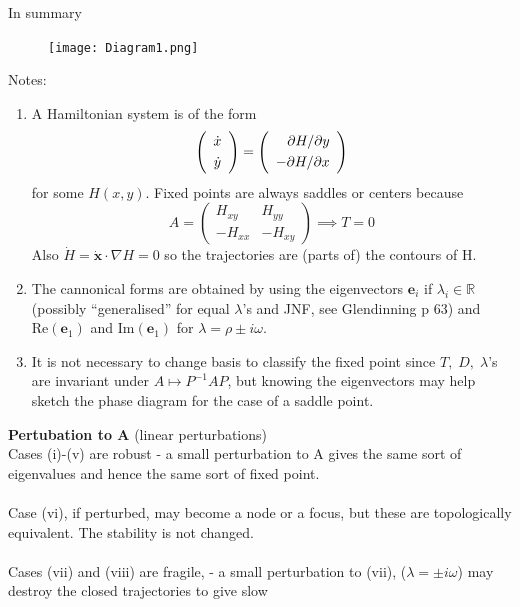 \documentclass{article}
\begin{document}
In summary 
\begin{figure}[H]
\centering
\texttt{[image: Diagram1.png]}
\end{figure}
%
Notes:
\begin{enumerate}[(1)]
\item A Hamiltonian system is of the form
\[ \left( \begin{array}{c} \dot{x} \vspace{1mm}\\ \dot{y} \end{array} \right) =
\left( \begin{array}{r} \partial H / \partial y \vspace{1mm}\\ - \partial H / \partial x \end{array} \right) \]
for some $H(x,y)$. Fixed points are always saddles or centers because
\[ A = \left( \begin{array}{rr} H_{xy} & H_{yy} \\ -H_{xx} & -H_{xy} \end{array} \right) \implies T = 0 \]
Also $\dot{H} = \dot{\bm{x}}\cdot \nabla H = 0$ so the trajectories are
 (parts of) the contours of H.

\item The cannonical forms are obtained by using the eigenvectors $\bm{e}_i$ if
$\lambda _ i \in \mathbb{R}$ (possibly ``generalised'' for equal $\lambda$'s
and JNF, see Glendinning p 63) and $\mathrm{Re}(\bm{e}_1)$ and $\mathrm{Im}(\bm{e}_1)$ for 
$\lambda = \rho \pm i \omega$.

\item It is not necessary to change basis to classify the fixed point since
$T, \; D, \; \lambda$'s are invariant under $A \mapsto P^{-1}AP$, but knowing 
the eigenvectors may help sketch the phase diagram for the case of a saddle 
point.
\end{enumerate}
%
\textbf{Pertubation to A} (linear perturbations) 
\\
Cases (i)-(v) are robust - a small perturbation to A gives the same sort of 
eigenvalues and hence the same sort of fixed point.
\\
\\
Case (vi), if perturbed, may become a node or a focus, but these are 
topologically equivalent. The stability is not changed.
\\
\\
Cases (vii) and (viii) are fragile, - a small perturbation to (vii),
($\lambda = \pm i \omega$) may destroy the closed trajectories to give slow
\end{document}
